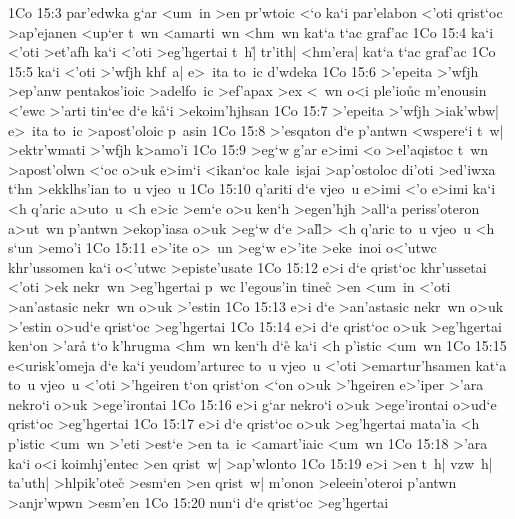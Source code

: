 \vs 1Co 15:3
par'edwka
g`ar
<um~in
>en
pr'wtoic
<`o
ka`i
par'elabon
<'oti
qrist`oc
>ap'ejanen
<up`er
t~wn
<amarti~wn
<hm~wn
kat`a
t`ac
graf'ac\bibvsend
\vs 1Co 15:4
ka`i
<'oti
>et'afh
ka`i
<'oti
>eg'hgertai
t~h|\r{}
tr'ith|
<hm'era|
kat`a
t`ac
graf'ac\bibvsend
\vs 1Co 15:5
ka`i
<'oti
>'wfjh
khf~a|
e>~ita
to~ic
d'wdeka\bibvsend
\vs 1Co 15:6
>'epeita
>'wfjh
>ep'anw
pentakos'ioic
>adelfo~ic
>ef'apax
>ex
<~wn
o<i
ple'io\r{u}c
m'enousin
<'ewc
>'arti
tin`ec
d`e
k\r{a}`i
>ekoim'hjhsan\bibvsend
\vs 1Co 15:7
>'epeita
>'wfjh
>iak'wbw|
e>~ita
to~ic
>apost'oloic
p~asin\bibvsend
\vs 1Co 15:8
>'esqaton
d`e
p'antwn
<wspere`i
t~w|
>ektr'wmati
>'wfjh
k>amo'i\bibvsend
\vs 1Co 15:9
>eg`w
g'ar
e>imi
<o
>el'aqistoc
t~wn
>apost'olwn
<`oc
o>uk
e>im`i
<ikan`oc
kale~isjai
>ap'ostoloc
di'oti
>ed'iwxa
t`hn
>ekklhs'ian
to~u
vjeo~u\bibvsend
\vs 1Co 15:10
q'ariti
d`e
vjeo~u
e>imi
<'o
e>imi
ka`i
<h
q'aric
a>uto~u
<h
e>ic
>em`e
o>u
ken`h
>egen'hjh
>all`a
periss'oteron
a>ut~wn
p'antwn
>ekop'iasa
o>uk
>eg`w
d`e
>al\r{l}>
<h
q'aric
to~u
vjeo~u
<h
s`un
>emo'i\bibvsend
\vs 1Co 15:11
e>'ite
o>~un
>eg`w
e>'ite
>eke~inoi
o<'utwc
khr'ussomen
ka`i
o<'utwc
>episte'usate\bibvsend
\vs 1Co 15:12
e>i
d`e
qrist`oc
khr'ussetai
<'oti
>ek
nekr~wn
>eg'hgertai
p~wc
l'egous'in
tinec\r{}
>en
<um~in
<'oti
>an'astasic
nekr~wn
o>uk
>'estin\bibvsend
\vs 1Co 15:13
e>i
d`e
>an'astasic
nekr~wn
o>uk
>'estin
o>ud`e
qrist`oc
>eg'hgertai\bibvsend
\vs 1Co 15:14
e>i
d`e
qrist`oc
o>uk
>eg'hgertai
ken`on
>'ar\r{a}
t`o
k'hrugma
<hm~wn
ken`h
d`e\r{}
ka`i
<h
p'istic
<um~wn\bibvsend
\vs 1Co 15:15
e<urisk'omeja
d`e
ka`i
yeudom'arturec
to~u
vjeo~u
<'oti
>emartur'hsamen
kat`a
to~u
vjeo~u
<'oti
>'hgeiren
t`on
qrist`on
<`on
o>uk
>'hgeiren
e>'iper
>'ara
nekro`i
o>uk
>ege'irontai\bibvsend
\vs 1Co 15:16
e>i
g`ar
nekro`i
o>uk
>ege'irontai
o>ud`e
qrist`oc
>eg'hgertai\bibvsend
\vs 1Co 15:17
e>i
d`e
qrist`oc
o>uk
>eg'hgertai
mata'ia
<h
p'istic
<um~wn
>'eti
>est`e
>en
ta~ic
<amart'iaic
<um~wn\bibvsend
\vs 1Co 15:18
>'ara
ka`i
o<i
koimhj'entec
>en
qrist~w|
>ap'wlonto\bibvsend
\vs 1Co 15:19
e>i
>en
t~h|
vzw~h|
ta'uth|
>hlpik'otec\r{}
>esm`en
>en
qrist~w|
m'onon
>eleein'oteroi
p'antwn
>anjr'wpwn
>esm'en\bibvsend
\vs 1Co 15:20
nun`i
d`e
qrist`oc
>eg'hgertai
